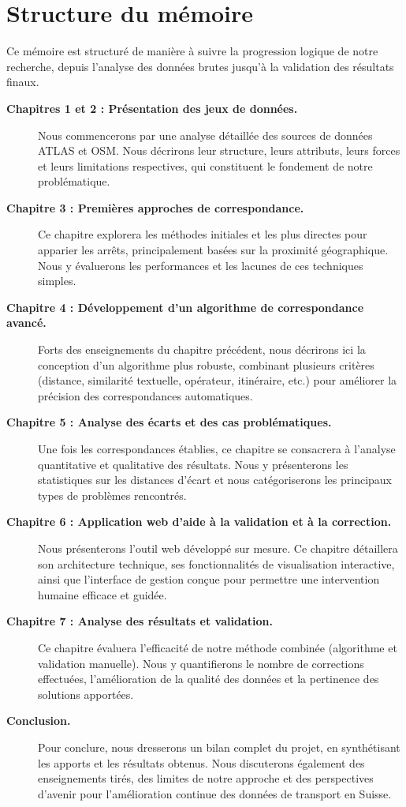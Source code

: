 \section*{Structure du mémoire}

Ce mémoire est structuré de manière à suivre la progression logique de notre recherche, depuis l'analyse des données brutes jusqu'à la validation des résultats finaux.

\begin{description}
    \item[\textbf{Chapitres 1 et 2 : Présentation des jeux de données.}] Nous commencerons par une analyse détaillée des sources de données ATLAS et OSM. Nous décrirons leur structure, leurs attributs, leurs forces et leurs limitations respectives, qui constituent le fondement de notre problématique.

    \item[\textbf{Chapitre 3 : Premières approches de correspondance.}] Ce chapitre explorera les méthodes initiales et les plus directes pour apparier les arrêts, principalement basées sur la proximité géographique. Nous y évaluerons les performances et les lacunes de ces techniques simples.

    \item[\textbf{Chapitre 4 : Développement d'un algorithme de correspondance avancé.}] Forts des enseignements du chapitre précédent, nous décrirons ici la conception d'un algorithme plus robuste, combinant plusieurs critères (distance, similarité textuelle, opérateur, itinéraire, etc.) pour améliorer la précision des correspondances automatiques.

    \item[\textbf{Chapitre 5 : Analyse des écarts et des cas problématiques.}] Une fois les correspondances établies, ce chapitre se consacrera à l'analyse quantitative et qualitative des résultats. Nous y présenterons les statistiques sur les distances d'écart et nous catégoriserons les principaux types de problèmes rencontrés.

    \item[\textbf{Chapitre 6 : Application web d'aide à la validation et à la correction.}] Nous présenterons l'outil web développé sur mesure. Ce chapitre détaillera son architecture technique, ses fonctionnalités de visualisation interactive, ainsi que l'interface de gestion conçue pour permettre une intervention humaine efficace et guidée.

    \item[\textbf{Chapitre 7 : Analyse des résultats et validation.}] Ce chapitre évaluera l'efficacité de notre méthode combinée (algorithme et validation manuelle). Nous y quantifierons le nombre de corrections effectuées, l'amélioration de la qualité des données et la pertinence des solutions apportées.

    \item[\textbf{Conclusion.}] Pour conclure, nous dresserons un bilan complet du projet, en synthétisant les apports et les résultats obtenus. Nous discuterons également des enseignements tirés, des limites de notre approche et des perspectives d'avenir pour l'amélioration continue des données de transport en Suisse.
\end{description}